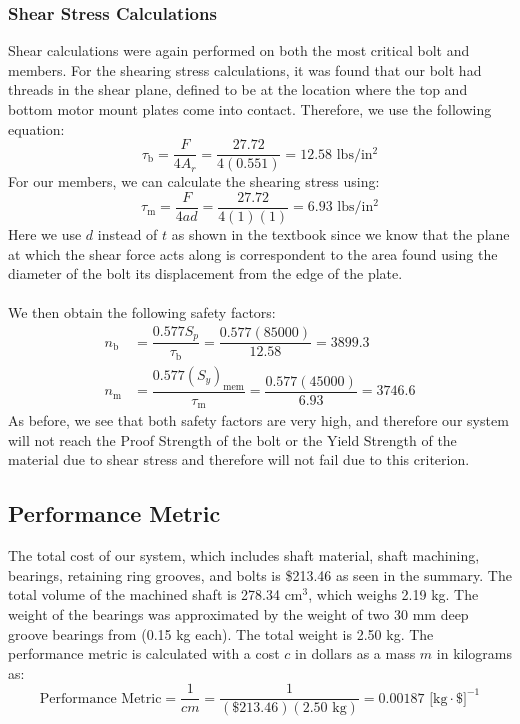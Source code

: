 \documentclass[letterpaper,12pt]{article}
\begin{document}
\subsubsection{Shear Stress Calculations}
Shear calculations were again performed on both the most critical bolt and members. For the shearing stress calculations, it was found that our bolt had threads in the shear plane, defined to be at the location where the top and bottom motor mount plates come into contact. Therefore, we use the following equation:
\begin{equation*}
    \tau_{\text{b}} = \dfrac{F}{4A_r} = \dfrac{27.72}{4(0.551)} = 12.58 \text{ lbs/in$^2$}
\end{equation*}
For our members, we can calculate the shearing stress using:
\begin{equation*}
    \tau_{\text{m}} = \dfrac{F}{4ad} = \dfrac{27.72}{4(1)(1)} = 6.93 \text{ lbs/in$^2$}
\end{equation*}
Here we use $d$ instead of $t$ as shown in the textbook since we know that the plane at which the shear force acts along is correspondent to the area found using the diameter of the bolt its displacement from the edge of the plate.\\\\
We then obtain the following safety factors:
\begin{align*}
    n_{\text{b}} &= \dfrac{0.577S_p}{\tau_{\text{b}}} = \dfrac{0.577(85000)}{12.58} = 3899.3\\
    n_{\text{m}} &= \dfrac{0.577(S_y)_{\text{mem}}}{\tau_{\text{m}}} = \dfrac{0.577(45000)}{6.93} = 3746.6
\end{align*}
As before, we see that both safety factors are very high, and therefore our system will not reach the Proof Strength of the bolt or the Yield Strength of the material due to shear stress and therefore will not fail due to this criterion.

\subsection{Performance Metric}

The total cost of our system, which includes shaft material, shaft machining, bearings, retaining ring grooves, and bolts is \$213.46 as seen in the summary. The total volume of the machined shaft is 278.34 cm$^3$, which weighs 2.19 kg. The weight of the bearings was approximated by the weight of two 30 mm deep groove bearings from \cite{bearings} (0.15 kg each). The total weight is 2.50 kg. The performance metric is calculated with a cost $c$ in dollars as a mass $m$ in kilograms as:
\begin{equation*}
    \text{Performance Metric} = \frac{1}{cm} = \frac{1}{(\$ 213.46)(2.50 \text{ kg})} = 0.00187 \text{ [kg}\cdot\text{\$]}^{-1}
\end{equation*}
\end{document}
